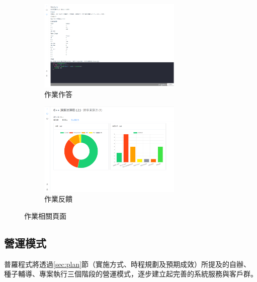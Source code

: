 \begin{figure}[H]
  \begin{subfigure}{0.5\linewidth}
    \centering
    \includegraphics[width=0.75\textwidth]{images/homework.png}
    \caption{作業作答}
  \end{subfigure}
  \begin{subfigure}{0.5\linewidth}
    \centering
    \includegraphics[width=0.75\textwidth]{images/feedback.png}
    \caption{作業反饋}
  \end{subfigure}
  \caption{作業相關頁面}
  \label{fig:homework}
\end{figure}

\newpage
\subsection{營運模式}

普羅程式將透過\ref{sec:plan}節（實施方式、時程規劃及預期成效）所提及的自辦、種子輔導、專案執行三個階段的營運模式，逐步建立起完善的系統服務與客戶群。

